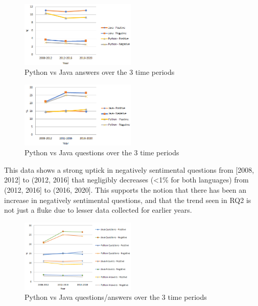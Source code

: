 \documentclass[conference]{IEEEtran}
\begin{document}
\begin{figure}[htbp]
\centerline{\includegraphics[width=0.49\textwidth]{figures/Java-python-answers.png}}
\caption{Python vs Java answers over the 3 time periods}
\label{fig}
\end{figure}

\begin{figure}[htbp]
\centerline{\includegraphics[width=0.49\textwidth]{figures/Java-python-questions.png}}
\caption{Python vs Java questions over the 3 time periods}
\label{fig}
\end{figure}

This data shows a strong uptick in negatively sentimental questions from [2008, 2012] to (2012, 2016] that negligibly decreases (<1\% for both languages) from (2012, 2016] to  (2016, 2020]. This supports the notion that there has been an increase in negatively sentimental questions, and that the trend seen in RQ2 is not just a fluke due to lesser data collected for earlier years.\\

\begin{figure}[htbp]
\centerline{\includegraphics[width=0.49\textwidth]{figures/Java-python-combined.png}}
\caption{Python vs Java questions/answers over the 3 time periods}
\label{fig}
\end{figure}
\end{document}
